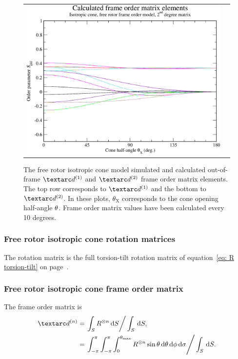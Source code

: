 \begin{figure}
\begin{tabular}{@{}cc@{}}
    \includegraphics[width=.5\textwidth]{images/frame_order_matrix/Sijkl_iso_cone_free_rotor_out_of_frame_theta_x_calc.eps} \\
  \end{tabular}
  \caption[Free-rotor isotropic cone simulated and calculated out-of-frame Daeg$^{(1)}$ and Daeg$^{(2)}$ elements.]{
    The free rotor isotropic cone model simulated and calculated out-of-frame $\FOone$ and $\FOtwo$ frame order matrix elements.
    The top row corresponds to $\FOone$ and the bottom to $\FOtwo$.
    In these plots, $\theta_\textrm{X}$ corresponds to the cone opening half-angle $\theta$.
    Frame order matrix values have been calculated every 10 degrees.
  }
  \label{fig: simulated and calculated out-of-frame 1st and 2nd degree iso cone, free rotor frame order}
\end{figure}


\subsubsection{Free rotor isotropic cone rotation matrices}

The rotation matrix is the full torsion-tilt rotation matrix of equation~\ref{eq: R torsion-tilt} on page~\pageref{eq: R torsion-tilt}.

\subsubsection{Free rotor isotropic cone frame order matrix}

The frame order matrix is
\begin{subequations}
\begin{align}
    \FOn &= \left. \int_S R^{\otimes n} \diff S \right / \int_S \diff S , \\
         &= \left. \int_{-\pi}^{\pi} \int_{-\pi}^{\pi} \int_{0}^{\conethetamax} R^{\otimes n} \sin\theta \diff\theta \diff\phi \diff\sigma  \right / \int_S \diff S .
\end{align}
\end{subequations}

